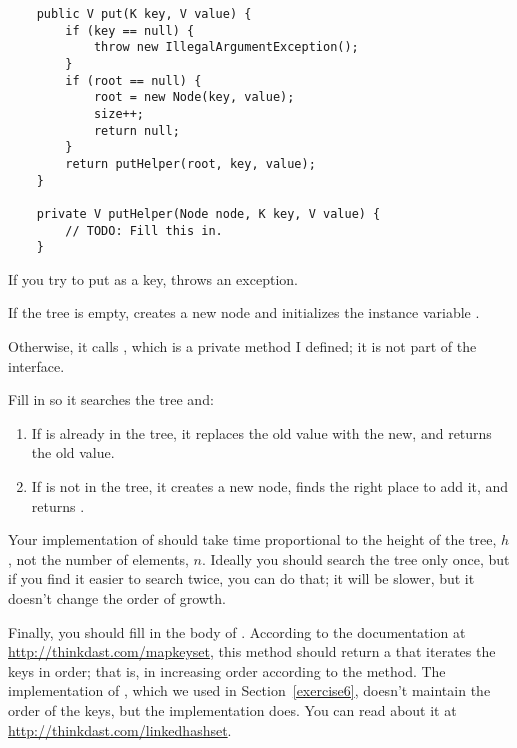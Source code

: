 \documentclass[12pt]{book}
\theoremstyle{exercise}
\begin{document}
\begin{verbatim}
    public V put(K key, V value) {
        if (key == null) {
            throw new IllegalArgumentException();
        }
        if (root == null) {
            root = new Node(key, value);
            size++;
            return null;
        }
        return putHelper(root, key, value);
    }

    private V putHelper(Node node, K key, V value) {
        // TODO: Fill this in.
    }
\end{verbatim}

If you try to put  as a key,  throws an
exception.

If the tree is empty,  creates a new node and initializes
the instance variable .


Otherwise, it calls , which is a private method I
defined; it is not part of the  interface.

Fill in  so it searches the tree and:

\begin{enumerate}

\item
  If  is already in the tree, it replaces the old value with
  the new, and returns the old value.

\item
  If  is not in the tree, it creates a new node, finds the
  right place to add it, and returns .

\end{enumerate}

Your implementation of  should take time proportional to the
height of the tree, $h$, not the number of elements, $n$. Ideally you
should search the tree only once, but if you find it easier to search
twice, you can do that; it will be slower, but it doesn't change the
order of growth.


Finally, you should fill in the body of .  According to
the documentation at \url{http://thinkdast.com/mapkeyset}, this method
should return a  that iterates the keys in order; that is,
in increasing order according to the  method.  The
 implementation of , which we used in
Section~\ref{exercise6}, doesn't maintain the order of the keys, but
the  implementation does.  You can read about it
at \url{http://thinkdast.com/linkedhashset}.
\end{document}
